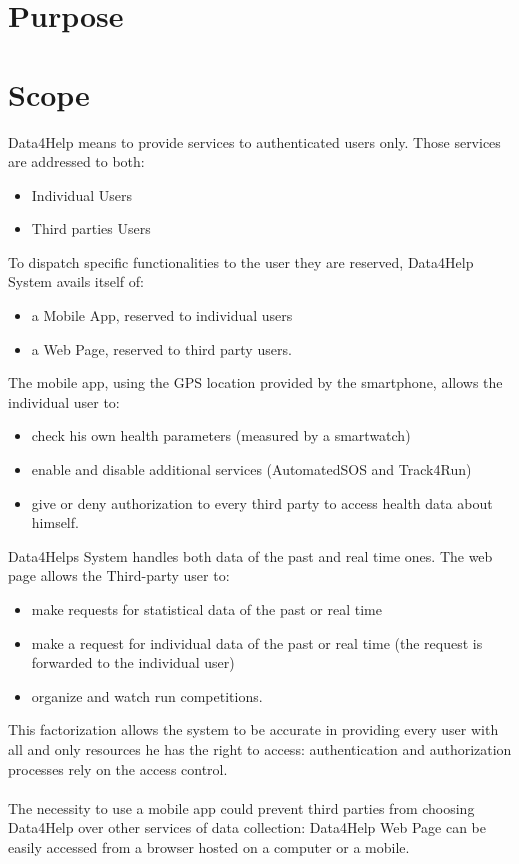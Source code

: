 \section{Purpose}
\section{Scope}
Data4Help means to provide services to authenticated users only. Those services are addressed to both:
\begin{itemize}
\item	Individual Users
\item Third parties Users
\end{itemize}
To dispatch specific functionalities to the user they are reserved, Data4Help System avails itself of:
\begin{itemize}
\item a Mobile App, reserved to individual users
\item a Web Page, reserved to third party users.
\end{itemize}
The mobile app, using the GPS location provided by the smartphone, allows the individual user to:
\begin{itemize}
\item check his own health parameters (measured by a smartwatch)
\item enable and disable additional services (AutomatedSOS and Track4Run)
\item give or deny authorization to every third party to access health data about himself.  
\end{itemize}
Data4Helps System handles both data of the past and real time ones.
The web page allows the Third-party user to:
\begin{itemize}
\item make requests for statistical data of the past or real time
\item make a request for individual data of the past or real time (the request is forwarded to the individual user)
\item organize and watch run competitions.
\end{itemize}
This factorization allows the system to be accurate in providing every user with all and only resources he has the right to access: authentication and authorization processes rely on the access control. \\ \\
The necessity to use a mobile app could prevent third parties from choosing Data4Help over other services of data collection: Data4Help Web Page can be easily accessed from a browser hosted on a computer or a mobile. 

